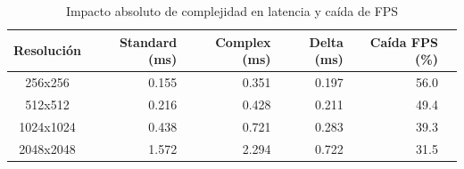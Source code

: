 \begin{table}[htbp]
\centering
\renewcommand{\arraystretch}{1.2}
\setlength{\tabcolsep}{6pt}
\begin{tabular}{|c|r|r|r|r|r|}
\hline
\rowcolor[gray]{0.90}
\textbf{Resolución} & \textbf{Standard (ms)} & \textbf{Complex (ms)} & \textbf{Delta (ms)} & \textbf{Caída FPS (\%)} \\
\hline
256x256 & 0.155 & 0.351 & 0.197 & 56.0 \\
\hline
512x512 & 0.216 & 0.428 & 0.211 & 49.4 \\
\hline
1024x1024 & 0.438 & 0.721 & 0.283 & 39.3 \\
\hline
2048x2048 & 1.572 & 2.294 & 0.722 & 31.5 \\
\hline
\end{tabular}
\caption{Impacto absoluto de complejidad en latencia y caída de FPS}
\label{tab:complexity_delta_latency_fps_equipo1_float32}
\end{table}
